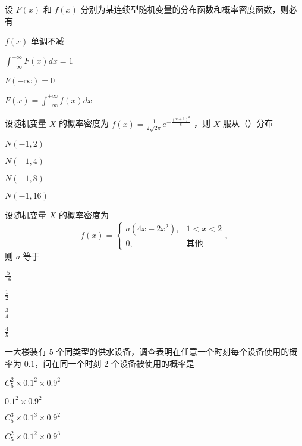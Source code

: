 \documentclass{exam-zh}
\begin{document}
\begin{question}
  设 $F(x)$ 和 $f(x)$ 分别为某连续型随机变量的分布函数和概率密度函数，则必有 \paren[C]
  \begin{choices}
    \item $f(x)$ 单调不减  
    \item $\int_{-\infty}^{+\infty} F(x) dx = 1$  
    \item $F(-\infty) = 0$  
    \item $F(x) = \int_{-\infty}^{+\infty} f(x) dx$  
  \end{choices}
\end{question}

\begin{question}
  设随机变量 $X$ 的概率密度为  
  $f(x) = \frac{1}{2\sqrt{2\pi}} e^{-\frac{(x+1)^2}{8}}$  
  ，则 $X$ 服从（\quad ）分布 \paren[B]
  \begin{choices}
    \item $N(-1, 2)$  
    \item $N(-1, 4)$  
    \item $N(-1, 8)$  
    \item $N(-1, 16)$  
  \end{choices}
\end{question}

\begin{question}
  设随机变量 $X$ 的概率密度为  
  $$f(x) = 
  \begin{cases} 
  a(4x - 2x^2), & 1 < x < 2 \\ 
  0, & \text{其他} 
  \end{cases},$$  
  则 $a$ 等于 \paren[C]
  \begin{choices}
    \item $\frac{5}{16}$  
    \item $\frac{1}{2}$  
    \item $\frac{3}{4}$  
    \item $\frac{4}{5}$  
  \end{choices}
\end{question}

\begin{question}
  一大楼装有 $5$ 个同类型的供水设备，调查表明在任意一个时刻每个设备使用的概率为 $0.1$，问在同一个时刻 $2$ 个设备被使用的概率是 \paren[D]
  \begin{choices}
    \item $C_5^2 \times 0.1^2 \times 0.9^2$  
    \item $0.1^2 \times 0.9^2$  
    \item $C_5^3 \times 0.1^3 \times 0.9^2$  
    \item $C_5^2 \times 0.1^2 \times 0.9^3$  
  \end{choices}
\end{question}
\end{document}

